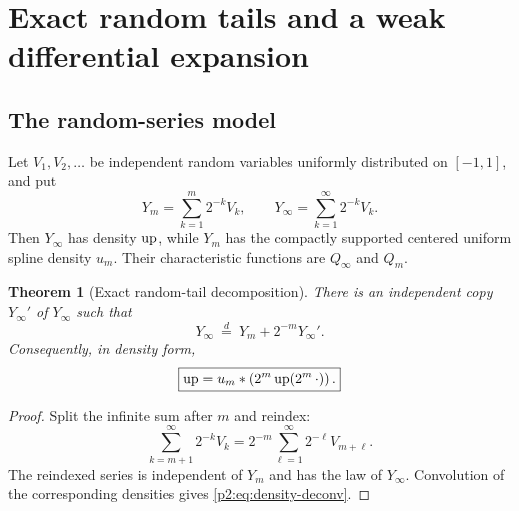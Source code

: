 \documentclass[11pt,oneside]{article}
\numberwithin{equation}{section}
\newtheorem{theorem}{Theorem}[section]
\theoremstyle{definition}
\theoremstyle{remark}
\begin{document}
\section{Exact random tails and a weak differential expansion}
\label{p2:sec:probability}

\subsection{The random-series model}

Let $V_1,V_2,\ldots$ be independent random variables uniformly distributed on $[-1,1]$, and
put
\begin{equation}
 Y_m=\sum_{k=1}^{m}2^{-k}V_k,
 \qquad
 Y_\infty=\sum_{k=1}^{\infty}2^{-k}V_k.
 \label{p2:eq:Ydef}
\end{equation}
Then $Y_\infty$ has density $\operatorname{up}$, while $Y_m$ has the compactly supported centered uniform
spline density $u_m$.  Their characteristic functions are $Q_\infty$ and $Q_m$.

\begin{theorem}[Exact random-tail decomposition]
\label{p2:thm:random-tail}
There is an independent copy $Y_\infty'$ of $Y_\infty$ such that
\begin{equation}
 \boxed{Y_\infty\ \stackrel{d}{=}\ Y_m+2^{-m}Y_\infty'.}
 \label{p2:eq:random-tail}
\end{equation}
Consequently, in density form,
\begin{equation}
 \boxed{
 \operatorname{up}=u_m*\left(2^m\operatorname{up}(2^m\,\cdot)\right).}
 \label{p2:eq:density-deconv}
\end{equation}
\newresult
\end{theorem}

\begin{proof}
Split the infinite sum after $m$ and reindex:
\[
 \sum_{k=m+1}^{\infty}2^{-k}V_k
 =2^{-m}\sum_{\ell=1}^{\infty}2^{-\ell}V_{m+\ell}.
\]
The reindexed series is independent of $Y_m$ and has the law of $Y_\infty$.  Convolution of
the corresponding densities gives \eqref{p2:eq:density-deconv}.
\end{proof}
\end{document}
